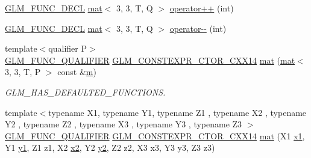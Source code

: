 \begin{DoxyCompactItemize}
\item 
\mbox{\hyperlink{setup_8hpp_ab2d052de21a70539923e9bcbf6e83a51}{G\+L\+M\+\_\+\+F\+U\+N\+C\+\_\+\+D\+E\+CL}} \mbox{\hyperlink{structglm_1_1mat}{mat}}$<$ 3, 3, T, Q $>$ \mbox{\hyperlink{structglm_1_1mat_3_013_00_013_00_01_t_00_01_q_01_4_a1c09b6fe99f20acf55ee20c1820ff0cd}{operator++}} (int)
\item 
\mbox{\hyperlink{setup_8hpp_ab2d052de21a70539923e9bcbf6e83a51}{G\+L\+M\+\_\+\+F\+U\+N\+C\+\_\+\+D\+E\+CL}} \mbox{\hyperlink{structglm_1_1mat}{mat}}$<$ 3, 3, T, Q $>$ \mbox{\hyperlink{structglm_1_1mat_3_013_00_013_00_01_t_00_01_q_01_4_a7d3a048df9c2f4e1ba2495b60655db4b}{operator-\/-\/}} (int)
\item 
{\footnotesize template$<$qualifier P$>$ }\\\mbox{\hyperlink{setup_8hpp_a33fdea6f91c5f834105f7415e2a64407}{G\+L\+M\+\_\+\+F\+U\+N\+C\+\_\+\+Q\+U\+A\+L\+I\+F\+I\+ER}} \mbox{\hyperlink{setup_8hpp_a0900f9145e68bf6061b6f5e7be3fa751}{G\+L\+M\+\_\+\+C\+O\+N\+S\+T\+E\+X\+P\+R\+\_\+\+C\+T\+O\+R\+\_\+\+C\+X\+X14}} \mbox{\hyperlink{structglm_1_1mat_3_013_00_013_00_01_t_00_01_q_01_4_a58f5f32696916511bd3c65a06ddded18}{mat}} (\mbox{\hyperlink{structglm_1_1mat}{mat}}$<$ 3, 3, T, P $>$ const \&\mbox{\hyperlink{_s_d_l__opengl__glext_8h_af593500c283bf1a787a6f947f503a5c2}{m}})
\begin{DoxyCompactList}\small\item\em G\+L\+M\+\_\+\+H\+A\+S\+\_\+\+D\+E\+F\+A\+U\+L\+T\+E\+D\+\_\+\+F\+U\+N\+C\+T\+I\+O\+NS. \end{DoxyCompactList}\item 
{\footnotesize template$<$typename X1, typename Y1, typename Z1 , typename X2 , typename Y2 , typename Z2 , typename X3 , typename Y3 , typename Z3 $>$ }\\\mbox{\hyperlink{setup_8hpp_a33fdea6f91c5f834105f7415e2a64407}{G\+L\+M\+\_\+\+F\+U\+N\+C\+\_\+\+Q\+U\+A\+L\+I\+F\+I\+ER}} \mbox{\hyperlink{setup_8hpp_a0900f9145e68bf6061b6f5e7be3fa751}{G\+L\+M\+\_\+\+C\+O\+N\+S\+T\+E\+X\+P\+R\+\_\+\+C\+T\+O\+R\+\_\+\+C\+X\+X14}} \mbox{\hyperlink{structglm_1_1mat_3_013_00_013_00_01_t_00_01_q_01_4_a16e5dfdbeabd922f89d0b7ac9a6a07cc}{mat}} (X1 \mbox{\hyperlink{_s_d_l__opengl__glext_8h_a49825216c96caaeb09237b36651181c5}{x1}}, Y1 \mbox{\hyperlink{_s_d_l__opengl__glext_8h_a3af6c78fcdfccea028a5878bc747ef39}{y1}}, Z1 z1, X2 \mbox{\hyperlink{_s_d_l__opengl__glext_8h_a7b907a03236685c534d89d604cff23c8}{x2}}, Y2 \mbox{\hyperlink{_s_d_l__opengl__glext_8h_a2be1135ed68e8d80fa9e130c7814f8c2}{y2}}, Z2 z2, X3 x3, Y3 y3, Z3 z3)
\item 

\end{DoxyCompactItemize}
